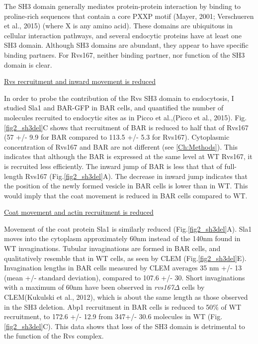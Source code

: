 	\vspace{5mm}
The SH3 domain generally mediates protein-protein interaction by binding to proline-rich sequences that contain a core PXXP motif (Mayer, 2001; Verschueren et al., 2015) (where X is any amino acid). These domains are ubiquitous in cellular interaction pathways, and several endocytic proteins have at least one SH3 domain. Although SH3 domains are abundant, they appear to have specific binding partners. For Rvs167, neither binding partner, nor function of the SH3 domain is clear. 


	\vspace{5mm}
\underline{Rvs recruitment and inward movement is reduced}

In order to probe the contribution of the Rvs SH3 domain to endocytosis, I studied Sla1 and BAR-GFP in BAR cells, and quantified the number of molecules recruited to endocytic sites as in Picco et al.,(Picco et al., 2015). Fig.\ref{fig2_sh3del}C shows that recruitment of BAR is reduced to half that of Rvs167 (57 +/- 9.9 for BAR compared to 113.5 +/- 5.3 for Rvs167). Cytoplasmic concentration of Rvs167 and BAR are not different (see \ref{Ch:Methods}). This indicates that although the BAR is expressed at the same level at WT Rvs167, it is recruited less efficiently. 
The inward jump of BAR is less that that of full-length Rvs167 (Fig.\ref{fig2_sh3del}A). The decrease in inward jump indicates that the position of the newly formed vesicle in BAR cells is lower than in WT. This would imply that the coat movement is reduced in BAR cells compared to WT.

\newpage
	\underline{Coat movement and actin recruitment is reduced}
	
Movement of the coat protein Sla1 is similarly reduced (Fig.\ref{fig2_sh3del}A). Sla1 moves into the cytoplasm approximately 60nm instead of the 140nm found in WT invaginations. Tubular invaginations are formed in BAR cells, and qualitatively resemble that in WT cells, as seen by CLEM  (Fig.\ref{fig2_sh3del}E). Invagination lengths in BAR cells measured by CLEM averages 35 nm +/- 13 (mean +/- standard deviation), compared to 107.6 +/- 30. Short invaginations with a maximum of 60nm have been observed in  \textit{rvs167$\Delta$} cells  by CLEM(Kukulski et al., 2012), which is about the same length as those observed in the SH3 deletion. 
Abp1 recruitment in BAR cells is reduced to 50\% of WT recruitment, to 172.6 +/- 12.9 from 347+/- 30.6 molecules in WT (Fig.\ref{fig2_sh3del}C). This data shows that loss of the SH3 domain is detrimental to the function of the Rvs complex. 


